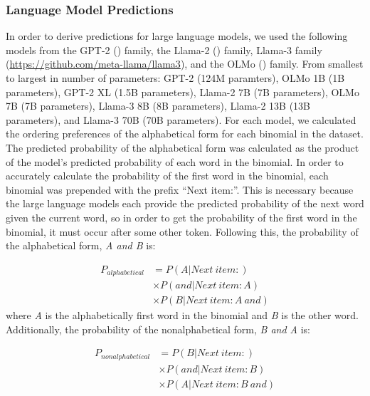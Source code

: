 \documentclass[
  12pt,
  letterpaper,
]{scrreport}
\begin{document}
\subsubsection{Language Model
Predictions}\label{language-model-predictions}

In order to derive predictions for large language models, we used the
following models from the GPT-2
()
family, the Llama-2 () family, Llama-3 family
(\hyperref[0]{https://github.com/meta-llama/llama3}), and the OLMo
() family. From smallest to largest in number of parameters: GPT-2
(124M paramters), OLMo 1B (1B parameters), GPT-2 XL (1.5B parameters),
Llama-2 7B (7B parameters), OLMo 7B (7B parameters), Llama-3 8B (8B
parameters), Llama-2 13B (13B parameters), and Llama-3 70B (70B
parameters). For each model, we calculated the ordering preferences of
the alphabetical form for each binomial in the dataset. The predicted
probability of the alphabetical form was calculated as the product of
the model's predicted probability of each word in the binomial. In order
to accurately calculate the probability of the first word in the
binomial, each binomial was prepended with the prefix ``Next item:''.
This is necessary because the large language models each provide the
predicted probability of the next word given the current word, so in
order to get the probability of the first word in the binomial, it must
occur after some other token. Following this, the probability of the
alphabetical form, \emph{A and B} is:

\[
\begin{aligned}
    P_{alphabetical} & = P(A|Next\:item: )\\
      & \times P(and|Next\:item: A)\\
      & \times P(B|Next\:item: A\: and)
\end{aligned}
\] \noindent where \emph{A} is the alphabetically first word in the
binomial and \emph{B} is the other word. Additionally, the probability
of the nonalphabetical form, \emph{B and A} is:

\[
\begin{aligned}
    P_{nonalphabetical} & = P(B|Next\:item: )\\
      & \times P(and|Next\:item: B)\\
      & \times P(A|Next\:item: B\: and)
\end{aligned}
\]
\end{document}

